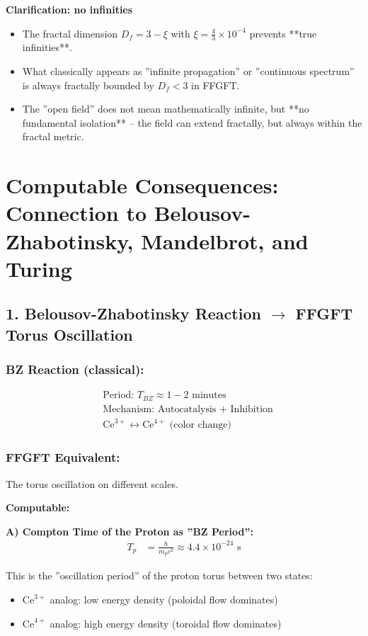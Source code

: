 	\textbf{Clarification: no infinities}
	\begin{itemize}[label=$\bullet$]
		\item The fractal dimension $D_f = 3 - \xi$ with $\xi = \frac{4}{3} \times 10^{-4}$ prevents **true infinities**.
		\item What classically appears as ''infinite propagation'' or ''continuous spectrum'' is always fractally bounded by $D_f < 3$ in FFGFT.
		\item The ''open field'' does not mean mathematically infinite, but **no fundamental isolation** – the field can extend fractally, but always within the fractal metric.
	\end{itemize}
	
	\section*{Computable Consequences: Connection to Belousov-Zhabotinsky, Mandelbrot, and Turing}
	
	\subsection*{1. Belousov-Zhabotinsky Reaction $\rightarrow$ FFGFT Torus Oscillation}
	
	\subsubsection*{BZ Reaction (classical):}
	\begin{align*}
		&\text{Period: } T_{BZ} \approx 1-2 \text{ minutes} \\
		&\text{Mechanism: Autocatalysis + Inhibition} \\
		&\text{Ce}^{3+} \longleftrightarrow \text{Ce}^{4+} \text{ (color change)}
	\end{align*}
	
	\subsubsection*{FFGFT Equivalent:}
	The torus oscillation on different scales.
	
	\textbf{Computable:}
	
	\textbf{A) Compton Time of the Proton as ''BZ Period'':}
	\begin{align*}
		T_p &= \frac{h}{m_p c^2} \approx 4.4 \times 10^{-24} \text{ s}
	\end{align*}
	
	This is the ''oscillation period'' of the proton torus between two states:
	\begin{itemize}
		\item $\text{Ce}^{3+}$ analog: low energy density (poloidal flow dominates)
		\item $\text{Ce}^{4+}$ analog: high energy density (toroidal flow dominates)
	\end{itemize}
	
